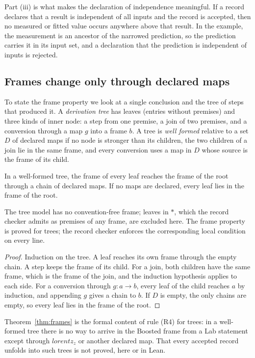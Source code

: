 Part (iii) is what makes the declaration of independence meaningful. If a record declares that a result is independent of all inputs and
the record is accepted, then no measured or fitted value occurs anywhere above that result. In the example, the measurement is an
ancestor of the narrowed prediction, so the prediction carries it in its input set, and a declaration that the prediction is
independent of inputs is rejected.

\subsection{Frames change only through declared maps}

To state the frame property we look at a single conclusion and the tree of steps that produced it. A \emph{derivation tree} has
leaves (entries without premises) and three kinds of inner node: a step from one premise, a join of two premises, and a conversion
through a map $g$ into a frame $b$. A tree is \emph{well formed} relative to a set $D$ of declared maps if no node is stronger than
its children, the two children of a join lie in the same frame, and every conversion uses a map in $D$ whose source is the frame of its
child.

\begin{theorem}[Frames]\label{thm:frames}
In a well-formed tree, the frame of every leaf reaches the frame of the root through a chain of declared maps. If no maps are
declared, every leaf lies in the frame of the root.
\end{theorem}
\noindent The tree model has no convention-free frame; leaves in $*$, which the record checker admits as premises of any frame, are
excluded here. The frame property is proved for trees; the record checker enforces the corresponding local condition on every line.


\begin{proof}
Induction on the tree. A leaf reaches its own frame through the empty chain. A step keeps the frame of its child. For a join, both
children have the same frame, which is the frame of the join, and the induction hypothesis applies to each side. For a conversion
through $g\colon a\to b$, every leaf of the child reaches $a$ by induction, and appending $g$ gives a chain to $b$. If $D$ is empty, the
only chains are empty, so every leaf lies in the frame of the root.
\end{proof}

Theorem~\ref{thm:frames} is the formal content of rule (R4) for trees: in a well-formed tree there is no way to arrive in the Boosted
frame from a Lab statement except through $\mathit{lorentz}_z$ or another declared map. That every accepted record unfolds into such
trees is not proved, here or in Lean.


